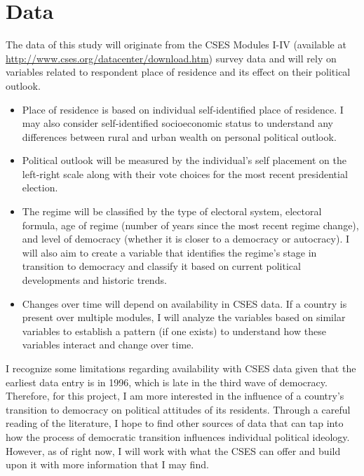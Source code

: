 \documentclass[12pt]{article}
\begin{document}
\renewcommand{\bibsection}{}
\nocite{*}



\section{Data}

The data of this study will originate from the CSES Modules I-IV (available at \url{http://www.cses.org/datacenter/download.htm}) survey data and will rely on variables related to respondent place of residence and its effect on their political outlook.

\begin{itemize}
\item Place of residence is based on individual self-identified place of residence. I may also consider self-identified socioeconomic status to understand any differences between rural and urban wealth on personal political outlook.
\item Political outlook will be measured by the individual's self placement on the left-right scale along with their vote choices for the most recent presidential election.
\item The regime will be classified by the type of electoral system, electoral formula, age of regime (number of years since the most recent regime change), and level of democracy (whether it is closer to a democracy or autocracy). I will also aim to create a variable that identifies the regime's stage in transition to democracy and classify it based on current political developments and historic trends.
\item Changes over time will depend on availability in CSES data. If a country is present over multiple modules, I will analyze the variables based on similar variables to establish a pattern (if one exists) to understand how these variables interact and change over time.
\end{itemize}

I recognize some limitations regarding availability with CSES data given that the earliest data entry is in 1996, which is late in the third wave of democracy. Therefore, for this project, I am more interested in the influence of a country's transition to democracy on political attitudes of its residents. Through a careful reading of the literature, I hope to find other sources of data that can tap into how the process of democratic transition influences individual political ideology. However, as of right now, I will work with what the CSES can offer and build upon it with more information that I may find. 
\end{document}
